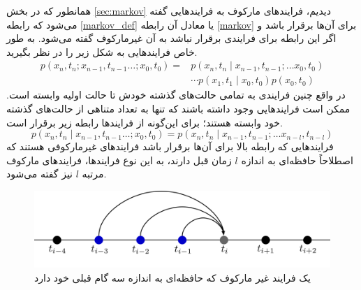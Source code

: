 همانطور که در بخش‌‌ \ref{sec:markov} دیدیم، فرایندهای مارکوف به فرایندهایی گفته می‌شود که رابطه \ref{markov_def} یا معادل آن رابطه \ref{markov} برای آن‌ها برقرار باشد و اگر این رابطه برای فرایندی برقرار نباشد به آن غیرمارکوف گفته می‌شود. به طور خاص فرایندهایی به شکل زیر را در نظر بگیرید.
\begin{equation}
  \begin{aligned}
    p(x_n,t_n ; x_{n-1},t_{n-1} \dotsc ;x_{0},t_0) = & p(x_n,t_n \mid x_{n-1},t_{n-1}; \dotsc x_{0},t_{0}) \\ 
    & \cdots p(x_1, t_1 \mid x_0, t_0)p(x_0, t_0)
  \end{aligned}
\end{equation}
در واقع چنین فرایندی به تمامی حالت‌های گذشته خودش تا حالت اولیه وابسته است. ممکن است فرایندهایی وجود داشته باشند که تنها به تعداد متناهی از 
حالت‌های گذشته خود وابسته هستند؛ برای این‌گونه از فرایندها رابطه زیر برقرار است.
\begin{equation}
  p(x_n,t_n \mid x_{n-1},t_{n-1} \dotsc ;x_{0},t_0) = p(x_n,t_n \mid x_{n-1},t_{n-1}; \dotsc x_{n-l},t_{n-l})
  \label{higher_markov_def}
\end{equation}
فرایندهایی که رابطه بالا برای آن‌ها برقرار  باشد فرایندهای غیرمارکوفی هستند که اصطلاحاً حافظه‌ای به اندازه $l$ زمان قبل دارند، به این نوع فرایندها، فرایندهای مارکوف مرتبه $l$ نیز گفته می‌شود. 
\begin{figure}[H]
  \centering
  \includegraphics[scale=1]{images/higher_m.png}
  \caption{یک فرایند غیر مارکوف که حافظه‌ای به اندازه سه گام قبلی خود دارد}
\end{figure}
\FloatBarrier

